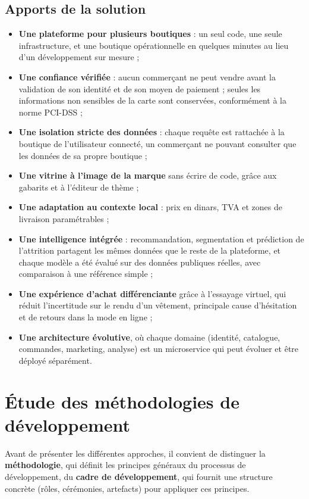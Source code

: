 \subsection{Apports de la solution}
\begin{itemize}
    \item \textbf{Une plateforme pour plusieurs boutiques} : un seul code, une seule infrastructure, et une boutique opérationnelle en quelques minutes au lieu d'un développement sur mesure ;
    \item \textbf{Une confiance vérifiée} : aucun commerçant ne peut vendre avant la validation de son identité et de son moyen de paiement ; seules les informations non sensibles de la carte sont conservées, conformément à la norme PCI-DSS ;
    \item \textbf{Une isolation stricte des données} : chaque requête est rattachée à la boutique de l'utilisateur connecté, un commerçant ne pouvant consulter que les données de sa propre boutique ;
    \item \textbf{Une vitrine à l'image de la marque} sans écrire de code, grâce aux gabarits et à l'éditeur de thème ;
    \item \textbf{Une adaptation au contexte local} : prix en dinars, TVA et zones de livraison paramétrables ;
    \item \textbf{Une intelligence intégrée} : recommandation, segmentation et prédiction de l'attrition partagent les mêmes données que le reste de la plateforme, et chaque modèle a été évalué sur des données publiques réelles, avec comparaison à une référence simple ;
    \item \textbf{Une expérience d'achat différenciante} grâce à l'essayage virtuel, qui réduit l'incertitude sur le rendu d'un vêtement, principale cause d'hésitation et de retours dans la mode en ligne ;
    \item \textbf{Une architecture évolutive}, où chaque domaine (identité, catalogue, commandes, marketing, analyse) est un microservice qui peut évoluer et être déployé séparément.
\end{itemize}

\section{Étude des méthodologies de développement}
Avant de présenter les différentes approches, il convient de distinguer la \textbf{méthodologie}, qui définit les principes généraux du processus de développement, du \textbf{cadre de développement}, qui fournit une structure concrète (rôles, cérémonies, artefacts) pour appliquer ces principes.

